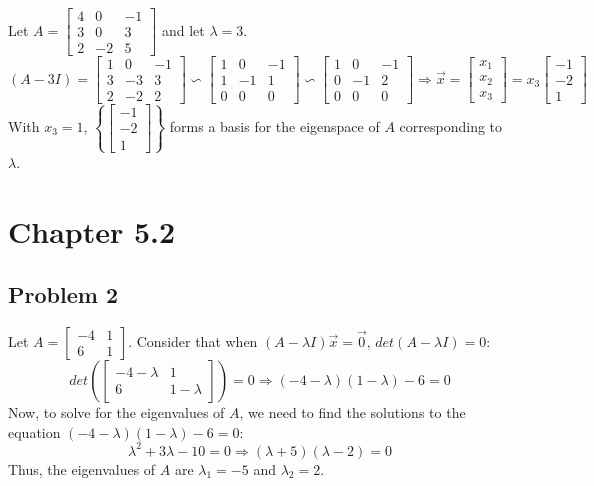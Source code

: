 \documentclass{article}%
\begin{document}
Let $A =
\begin{bmatrix}
    4 & 0 & -1 \\
    3 & 0 & 3 \\
    2 & -2 & 5
\end{bmatrix}$
and let $\lambda = 3$.
$$
(A - 3I) =
\begin{bmatrix}
    1 & 0 & -1 \\
    3 & -3 & 3 \\
    2 & -2 & 2
\end{bmatrix}
\backsim
\begin{bmatrix}
    1 & 0 & -1 \\
    1 & -1 & 1 \\
    0 & 0 & 0
\end{bmatrix}
\backsim
\begin{bmatrix}
    1 & 0 & -1 \\
    0 & -1 & 2 \\
    0 & 0 & 0
\end{bmatrix}\Rightarrow
\vec{x} =
\begin{bmatrix}
    x_1 \\ x_2 \\ x_3
\end{bmatrix}
=
x_3
\begin{bmatrix}
    -1 \\ -2 \\ 1
\end{bmatrix}
$$
With $x_3 = 1$, $\left\{\begin{bmatrix} -1 \\ -2 \\ 1 \end{bmatrix}\right\}$ forms a basis for the eigenspace of $A$ corresponding to $\lambda$.


\section*{Chapter 5.2}

\subsection*{Problem 2}

Let $A =
\begin{bmatrix}
    -4 & 1 \\
    6 & 1
\end{bmatrix}$. Consider that when $(A - \lambda I)\vec{x} = \vec{0}$, $det(A - \lambda I) = 0$:
$$
det\left(
\begin{bmatrix}
    -4 - \lambda & 1 \\
    6 & 1 - \lambda
\end{bmatrix}
\right) = 0
\Rightarrow
(-4 - \lambda)(1 - \lambda) - 6 = 0
$$
Now, to solve for the eigenvalues of $A$, we need to find the solutions to the equation $(-4 - \lambda)(1 - \lambda) - 6 = 0$:
$$
\lambda^2 + 3\lambda - 10 = 0
\Rightarrow
(\lambda + 5)(\lambda - 2) = 0
$$
Thus, the eigenvalues of $A$ are $\lambda_1 = -5$ and $\lambda_2 = 2$.
\end{document}
